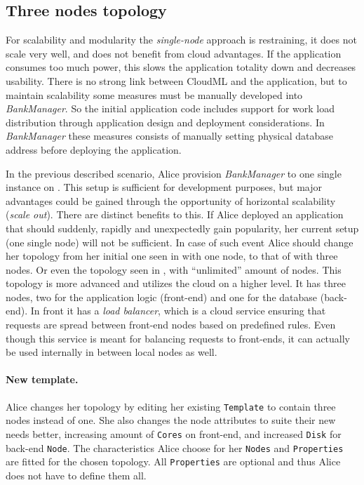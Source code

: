 \subsection{Three nodes topology}

For scalability and modularity the \emph{single-node} approach is restraining,
\ie it does not scale very well, and does not benefit from cloud advantages.
If the application consumes too much  power, 
this slows the application totality down and decreases usability.
There is no strong link between CloudML and the application, but to maintain
scalability some measures must be manually developed into \emph{BankManager}.
So the initial application code includes support for work load distribution through 
application design and deployment considerations.
In \emph{BankManager} these measures consists of manually setting 
physical database address before deploying the application.

In the previous described scenario, 
Alice provision \emph{BankManager} to one single instance on .
This setup is sufficient for development purposes, but major advantages
could be gained through the opportunity of horizontal scalability (\emph{scale out}).
There are distinct benefits to this.
If Alice deployed an application that should suddenly, 
rapidly and unexpectedly gain popularity, her current setup (one single node) will not be sufficient.
In case of such event Alice should change her topology from her initial one seen in 
 with one node, to that of  with three nodes.
Or even the topology seen in , with ``unlimited'' amount of nodes.
This topology is more advanced and utilizes the cloud on a higher level.
It has three nodes, two for the application logic (front-end) and one for the database (back-end).
In front it has a \emph{load balancer}, which is a cloud service ensuring that requests
are spread between front-end nodes based on predefined rules.
Even though this service is meant for balancing requests to front-ends,
it can actually be used internally in between local nodes as well.

\paragraph{New template.}

Alice changes her topology by editing her existing \texttt{Template} 
to contain three nodes instead of one. 
She also changes the node attributes to suite their new needs better,
\ie increasing amount of \texttt{Cores} on front-end, and increased \texttt{Disk} for back-end \texttt{Node}.
The characteristics Alice choose for her \texttt{Nodes} and \texttt{Properties} are fitted
for the chosen topology.
All \texttt{Properties} are optional and thus Alice does not have to define them all.

